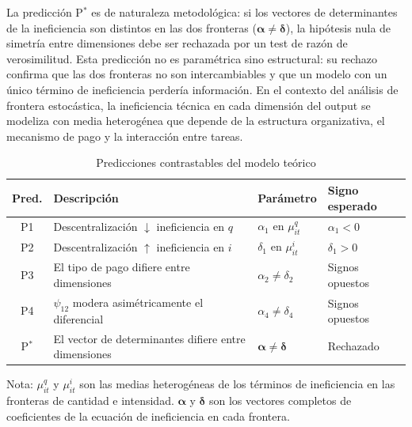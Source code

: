 \documentclass[12pt, a4paper, twoside, openright]{book}
\newcommand{\bsym}[1]{\boldsymbol{#1}}
\theoremstyle{plain}
\theoremstyle{definition}
\theoremstyle{remark}
\begin{document}
La predicción P$^*$ es de naturaleza metodológica: si los vectores de determinantes de la ineficiencia son distintos en las dos fronteras ($\bsym{\alpha}\neq\bsym{\delta}$), la hipótesis nula de simetría entre dimensiones debe ser rechazada por un test de razón de verosimilitud. Esta predicción no es paramétrica sino estructural: su rechazo confirma que las dos fronteras no son intercambiables y que un modelo con un único término de ineficiencia perdería información. En el contexto del análisis de frontera estocástica, la ineficiencia técnica en cada dimensión del output se modeliza con media heterogénea que depende de la estructura organizativa, el mecanismo de pago y la interacción entre tareas.

\begin{table}[htbp]
\centering
\caption{Predicciones contrastables del modelo teórico}
\label{tab:predicciones}
\begin{threeparttable}
\begin{tabularx}{\linewidth}{cXp{3cm}p{2.5cm}}
\toprule
\textbf{Pred.} & \textbf{Descripción} &
\textbf{Parámetro} & \textbf{Signo esperado} \\
\midrule
P1 & Descentralización $\downarrow$ ineficiencia en $q$
   & $\alpha_1$ en $\mu^q_{it}$ & $\alpha_1 < 0$ \\[3pt]
P2 & Descentralización $\uparrow$ ineficiencia en $i$
   & $\delta_1$ en $\mu^i_{it}$ & $\delta_1 > 0$ \\[3pt]
P3 & El tipo de pago difiere entre dimensiones
   & $\alpha_2 \neq \delta_2$ & Signos opuestos \\[3pt]
P4 & $\psi_{12}$ modera asimétricamente el diferencial
   & $\alpha_4 \neq \delta_4$ & Signos opuestos \\[3pt]
P$^*$ & El vector de determinantes difiere entre
         dimensiones & $\bsym{\alpha} \neq \bsym{\delta}$
       & Rechazado \\
\bottomrule
\end{tabularx}
\begin{tablenotes}
  \small
  \item Nota: $\mu^q_{it}$ y $\mu^i_{it}$ son las medias heterogéneas de los términos de ineficiencia en las fronteras de cantidad e intensidad. $\bsym{\alpha}$ y $\bsym{\delta}$ son los vectores completos de coeficientes de la ecuación de ineficiencia en cada frontera.
\end{tablenotes}
\end{threeparttable}
\end{table}
\end{document}
